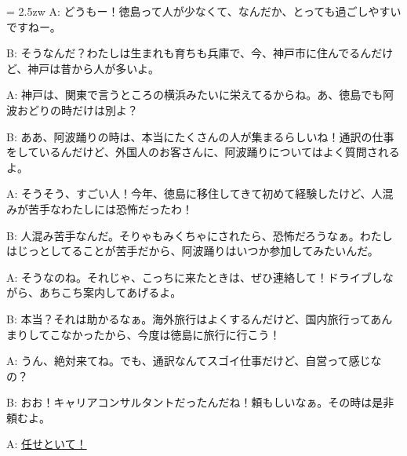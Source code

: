 \documentclass[11pt]{amsart}
\title{}
\author{}
\newenvironment{hangall}[1]{\hangindent = 2.5zw\everypar{\hangindent = 2.5zw}}{}
\begin{document}
\maketitle
\begin{hangall}{}%
A: どうもー！徳島って人が少なくて、なんだか、とっても過ごしやすいですねー。

B: そうなんだ？わたしは生まれも育ちも兵庫で、今、神戸市に住んでるんだけど、神戸は昔から人が多いよ。

A: 神戸は、関東で言うところの横浜みたいに栄えてるからね。あ、徳島でも阿波おどりの時だけは別よ？

B: ああ、阿波踊りの時は、本当にたくさんの人が集まるらしいね！通訳の仕事をしているんだけど、外国人のお客さんに、阿波踊りについてはよく質問されるよ。

A: そうそう、すごい人！今年、徳島に移住してきて初めて経験したけど、人混みが苦手なわたしには恐怖だったわ！

B: 人混み苦手なんだ。そりゃもみくちゃにされたら、恐怖だろうなぁ。わたしはじっとしてることが苦手だから、阿波踊りはいつか参加してみたいんだ。

A: そうなのね。それじゃ、こっちに来たときは、ぜひ連絡して！ドライブしながら、あちこち案内してあげるよ。

B: 本当？それは助かるなぁ。海外旅行はよくするんだけど、国内旅行ってあんまりしてこなかったから、今度は徳島に旅行に行こう！

A: うん、絶対来てね。でも、通訳なんてスゴイ仕事だけど、自営って感じなの？

B: おお！キャリアコンサルタントだったんだね！頼もしいなぁ。その時は是非頼むよ。

A: \ul{任せといて！}\end{hangall}
\end{document}
